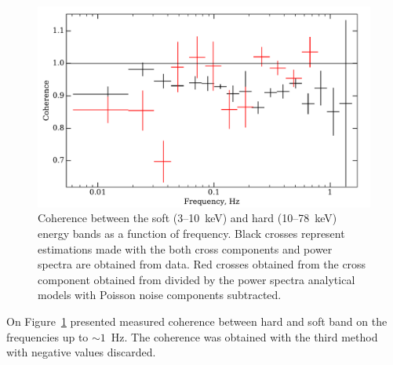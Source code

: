 \documentclass[a4paper,fleqn,usenatbib]{mnras}
\begin{document}
\begin{figure}
    \includegraphics[width=\columnwidth]{coherence_3.pdf}
    \caption{Coherence between the soft (3--10~keV) and hard (10--78~keV) energy bands as a function of frequency. 
     Black crosses  represent estimations made with the both cross components and power spectra are obtained from data.
     Red crosses obtained from the cross component obtained from divided by the power spectra analytical models with Poisson noise components subtracted.}
    \label{fig:coherence}
\end{figure}


On Figure~\ref{fig:coherence} presented measured coherence between hard and soft band on the frequencies up to $\sim1$~Hz. 
The coherence was obtained with the third method with negative values discarded. 

\end{document}
